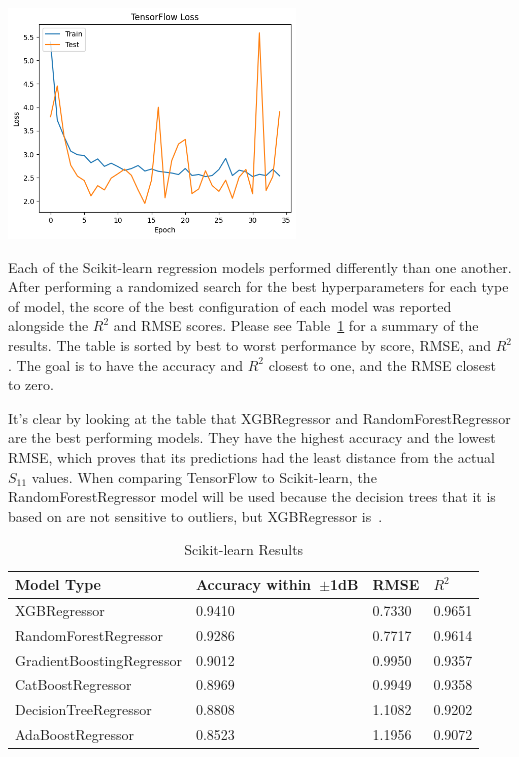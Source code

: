\documentclass[lettersize,journal]{IEEEtran}
\newenvironment{Figure}
    {\par\medskip\noindent\minipage{\linewidth}}
    {\endminipage\par\medskip}
\begin{document}
\begin{Figure}
    \centering
    \includegraphics[width=3in]{loss}
    \label{dnn_loss_graph}
\end{Figure}

Each of the Scikit-learn regression models performed differently than one another. After performing a randomized search for the best hyperparameters for each type of model, the score of the best configuration of each model was reported alongside the $R^2$ and RMSE scores. Please see Table~\ref{comparing_sklearn} for a summary of the results. The table is sorted by best to worst performance by score, RMSE, and $R^2$. The goal is to have the accuracy and $R^2$ closest to one, and the RMSE closest to zero. 

It's clear by looking at the table that XGBRegressor and RandomForestRegressor are the best performing models. They have the highest accuracy and the lowest RMSE, which proves that its predictions had the least distance from the actual $S_{11}$ values. When comparing TensorFlow to Scikit-learn, the RandomForestRegressor model will be used because the decision trees that it is based on are not sensitive to outliers, but XGBRegressor is~\cite{BROWN2009541,Li_2018}. 

\begin{table}[h]
\caption{Scikit-learn Results}
\begin{center}
\begin{tabular}{ |l|l|l|l| }
    \hline
    Model Type & Accuracy within~$\pm$1dB & RMSE & $R^2$ \\ 
    \hline
    XGBRegressor & 0.9410 & 0.7330 & 0.9651 \\  
    \hline
    RandomForestRegressor & 0.9286 & 0.7717 & 0.9614 \\
    \hline  
    GradientBoostingRegressor & 0.9012 & 0.9950 & 0.9357 \\
    \hline
    CatBoostRegressor & 0.8969 & 0.9949 & 0.9358 \\    
    \hline
    DecisionTreeRegressor & 0.8808 & 1.1082 & 0.9202 \\  
    \hline
    AdaBoostRegressor & 0.8523 & 1.1956 & 0.9072 \\  
    \hline
\end{tabular}
\end{center}
\label{comparing_sklearn}
\end{table}
\end{document}
